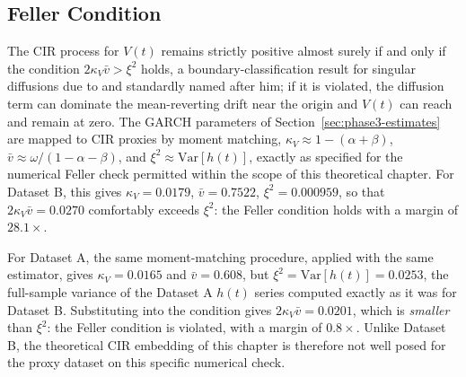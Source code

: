 \documentclass[11pt, a4paper, twoside]{article}
\begin{document}
\subsection{Feller Condition}
\label{sec:phase5-feller}

The CIR process for $V(t)$ remains strictly positive almost surely if and only if the condition $2\kappa_V \bar v > \xi^2$ holds, a boundary-classification result for singular diffusions due to \citet{Feller1951} and standardly named after him; if it is violated, the diffusion term can dominate the mean-reverting drift near the origin and $V(t)$ can reach and remain at zero. The GARCH parameters of Section~\ref{sec:phase3-estimates} are mapped to CIR proxies by moment matching, $\kappa_V \approx 1-(\alpha+\beta)$, $\bar v \approx \omega/(1-\alpha-\beta)$, and $\xi^2 \approx \mathrm{Var}[h(t)]$, exactly as specified for the numerical Feller check permitted within the scope of this theoretical chapter. For Dataset B, this gives $\kappa_V = 0.0179$, $\bar v = 0.7522$, $\xi^2 = 0.000959$, so that $2\kappa_V\bar v = 0.0270$ comfortably exceeds $\xi^2$: the Feller condition holds with a margin of $28.1\times$.

For Dataset A, the same moment-matching procedure, applied with the same estimator, gives $\kappa_V = 0.0165$ and $\bar v = 0.608$, but $\xi^2 = \mathrm{Var}[h(t)] = 0.0253$, the full-sample variance of the Dataset A $h(t)$ series computed exactly as it was for Dataset B. Substituting into the condition gives $2\kappa_V\bar v = 0.0201$, which is \emph{smaller} than $\xi^2$: the Feller condition is violated, with a margin of $0.8\times$. Unlike Dataset B, the theoretical CIR embedding of this chapter is therefore not well posed for the proxy dataset on this specific numerical check.
\end{document}
